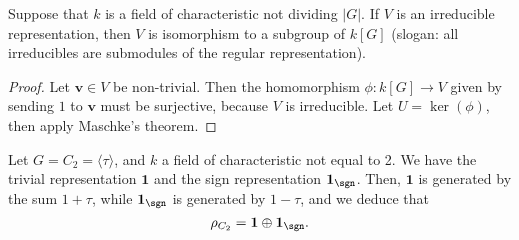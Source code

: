 \documentclass{willowtreebook}
\begin{document}
\begin{corollary}
Suppose that $k$ is a field of characteristic not dividing $|G|$.  If $V$ is an irreducible representation, then $V$ is isomorphism to a subgroup of $k[G]$ (slogan: all irreducibles are submodules of the regular representation). 
\end{corollary}
\begin{proof}
    Let $\mathbf{v} \in V$ be non-trivial. Then the homomorphism $\phi \colon k[G] \to V$ given by sending $1$ to $\mathbf{v}$ must be surjective, because $V$ is irreducible. Let $U = \ker(\phi)$, then apply Maschke's theorem. 
\end{proof}
\begin{example}
    Let $G = C_2 = \langle \tau \rangle$, and $k$ a field of characteristic not equal to 2. We have the trivial representation $\mathbf{1}$ and the sign representation $\mathbf{1}_{\sgn}$. Then, $\mathbf{1}$ is generated by the sum $1+\tau$, while $\mathbf{1}_{\sgn}$ is generated by $1-\tau$, and we deduce that 
    \[
\rho_{C_2} = \mathbf{1} \oplus \mathbf{1}_{\sgn}. 
    \]
\end{example}
\par\bigskip\noindent

\end{document}
